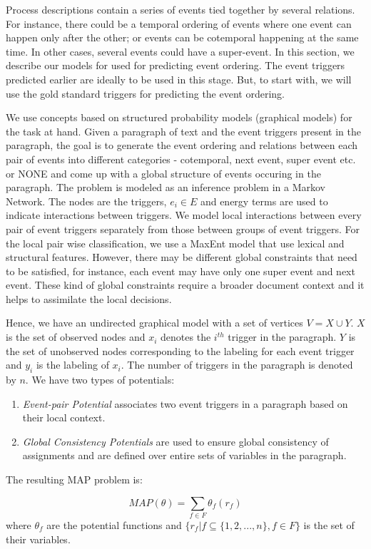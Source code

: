 Process descriptions contain a series of events tied together by several relations. For instance, there could be a temporal ordering of events where one event can happen only after the other; or events can be cotemporal happening at the same time. In other cases, several events could have a super-event. In this section, we describe our models for used for predicting event ordering. The event triggers predicted earlier are ideally to be used in this stage. But, to start with, we will use the gold standard triggers for predicting the event ordering.

We use concepts based on structured probability models (graphical models) for the task at hand. Given a paragraph of text and the event triggers present in the paragraph, the goal is to generate the event ordering and relations between each pair of events into different categories - cotemporal, next event, super event etc. or NONE and come up with a global structure of events occuring in the paragraph. The problem is modeled as an inference problem in a Markov Network. The nodes are the triggers, $e_i \in E$ and energy terms are used to indicate interactions between triggers. We model local interactions between every pair of event triggers separately from those between groups of event triggers. For the local pair wise classification, we use a MaxEnt model that use lexical and structural features. However, there may be different global constraints that need to be satisfied, for instance, each event may have only one super event and next event. These kind of global constraints require a broader document context and it helps to assimilate the local decisions.

Hence, we have an undirected graphical model with a set of vertices $V = X \cup Y$. $X$ is the set of observed nodes and $x_i$ denotes the $i^{th}$ trigger in the paragraph. $Y$ is the set of unobserved nodes corresponding to the labeling for each event trigger and $y_i$ is the labeling of $x_i$. The number of triggers in the paragraph is denoted by $n$. We have two types of potentials:

\begin{enumerate}
\item {\em Event-pair Potential} associates two event triggers in a paragraph based on their local context.
\item {\em Global Consistency Potentials} are used to ensure global consistency of assignments and are defined over entire sets of variables in the paragraph.
\end{enumerate}

The resulting MAP problem is:

\begin{equation}
MAP(\theta) = \sum_{f \in F} \theta_f(r_f)
\end{equation}
where $\theta_f$ are the potential functions and $\{r_f|f\subseteq\{1,2,...,n\}, f \in F\}$ is the set of their variables.
